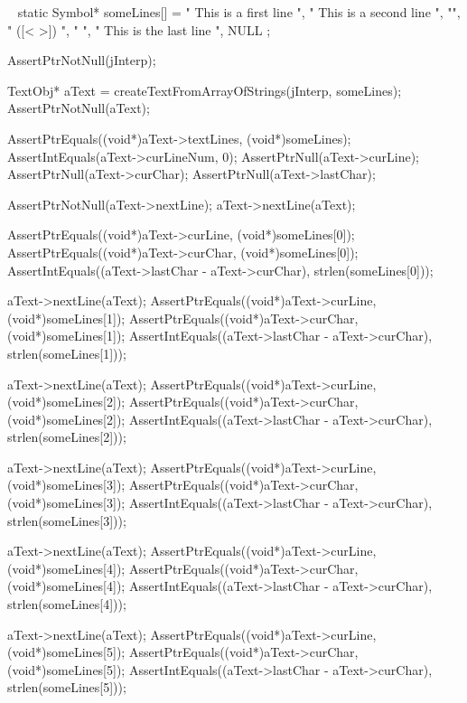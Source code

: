 \CTestsSetup\
\startCTest
static Symbol* someLines[] = {
  "  This is a first line  ",
  "  This is a second line   ",
  "",
  " ([<{ }>]) ",
  "     	",
  "  This is the last line  ",
  NULL
};
\stopCTest

\startCTest
  AssertPtrNotNull(jInterp);

  TextObj* aText = createTextFromArrayOfStrings(jInterp, someLines);
  AssertPtrNotNull(aText);

  AssertPtrEquals((void*)aText->textLines, (void*)someLines);
  AssertIntEquals(aText->curLineNum, 0);
  AssertPtrNull(aText->curLine);
  AssertPtrNull(aText->curChar);
  AssertPtrNull(aText->lastChar);
  
  AssertPtrNotNull(aText->nextLine);
  aText->nextLine(aText);

  AssertPtrEquals((void*)aText->curLine, (void*)someLines[0]);
  AssertPtrEquals((void*)aText->curChar, (void*)someLines[0]);
  AssertIntEquals((aText->lastChar - aText->curChar),
                        strlen(someLines[0]));

  aText->nextLine(aText);
  AssertPtrEquals((void*)aText->curLine, (void*)someLines[1]);
  AssertPtrEquals((void*)aText->curChar, (void*)someLines[1]);
  AssertIntEquals((aText->lastChar - aText->curChar),
                        strlen(someLines[1]));

  aText->nextLine(aText);
  AssertPtrEquals((void*)aText->curLine, (void*)someLines[2]);
  AssertPtrEquals((void*)aText->curChar, (void*)someLines[2]);
  AssertIntEquals((aText->lastChar - aText->curChar),
                        strlen(someLines[2]));

  aText->nextLine(aText);
  AssertPtrEquals((void*)aText->curLine, (void*)someLines[3]);
  AssertPtrEquals((void*)aText->curChar, (void*)someLines[3]);
  AssertIntEquals((aText->lastChar - aText->curChar),
                        strlen(someLines[3]));

  aText->nextLine(aText);
  AssertPtrEquals((void*)aText->curLine, (void*)someLines[4]);
  AssertPtrEquals((void*)aText->curChar, (void*)someLines[4]);
  AssertIntEquals((aText->lastChar - aText->curChar),
                        strlen(someLines[4]));

  aText->nextLine(aText);
  AssertPtrEquals((void*)aText->curLine, (void*)someLines[5]);
  AssertPtrEquals((void*)aText->curChar, (void*)someLines[5]);
  AssertIntEquals((aText->lastChar - aText->curChar),
                        strlen(someLines[5]));

